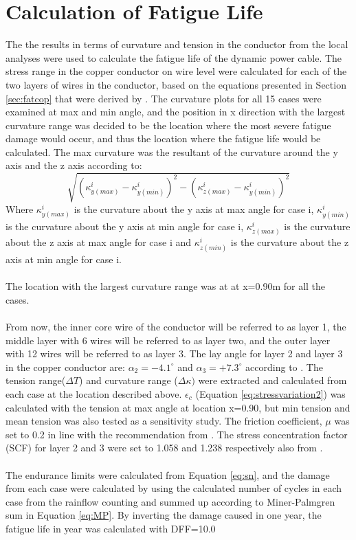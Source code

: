 \section{Calculation of Fatigue Life}
\label{sec:fatiguelife}
The the results in terms of curvature and tension in the conductor from the local analyses were used to calculate the fatigue life of the dynamic power cable. The stress range in the copper conductor on wire level were calculated for each of the two layers of wires in the conductor, based on the equations presented in Section \ref{sec:fatcop} that were derived by \cite{s300}. The curvature plots for all 15 cases were examined at max and min angle, and the position in x direction with the largest curvature range was decided to be the location where the most severe fatigue damage would occur, and thus the location where the fatigue life would be calculated. The max curvature was the resultant of the curvature around the y axis and the z axis according to:
\begin{equation}
\sqrt{(\kappa_{y(max)}^i-\kappa_{y(min)}^i)^2 - (\kappa_{z(max)}^i- \kappa_{y(min)}^i)^2}
\end{equation}
Where $\kappa_{y(max)}^i$ is the curvature about the y axis at max angle for case i, $\kappa_{y(min)}^i$ is the curvature about the y axis at min angle for case i, $\kappa_{z(max)}^i$ is the curvature about the z axis at max angle for case i and $\kappa_{z(min)}^i$ is the curvature about the z axis at min angle for case i. \\\\
The location with the largest curvature range was at at x=0.90m for all the cases. \\\\
From now, the inner core wire of the conductor will be referred to as layer 1, the middle layer with 6 wires will be referred to as layer two, and the outer layer with 12 wires will be referred to as layer 3. The lay angle for layer 2 and layer 3 in the copper conductor are: $\alpha_2=-4.1^\circ$ and $\alpha_3=+7.3^\circ$ according to \cite{Nasution2013}. The tension range($\Delta T$) and curvature range ($\Delta \kappa)$ were extracted and calculated from each case at the location described above. $\epsilon_c$ (Equation \ref{eq:stressvariation2}) was calculated with the tension at max angle at location x=0.90, but min tension and mean tension was also tested as a sensitivity study. The friction coefficient, $\mu$ was set to 0.2 in line with the recommendation from \cite{NASUTION2014}. The stress concentration factor (SCF) for layer 2 and 3 were set to 1.058 and 1.238 respectively also from \cite{NASUTION2014}. \\\\
The endurance limits were calculated from Equation \ref{eq:sn}, and the damage from each case were calculated by using the calculated number of cycles in each case from the rainflow counting and summed up according to Miner-Palmgren sum in Equation \ref{eq:MP}. By inverting the damage caused in one year, the fatigue life in year was calculated with DFF=10.0

